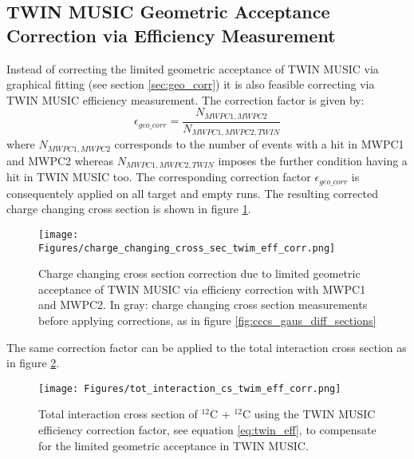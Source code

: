 \begin{appendices}
\section {TWIN MUSIC Geometric Acceptance Correction via Efficiency Measurement}
Instead of correcting the limited geometric acceptance of TWIN MUSIC via graphical fitting (see section \ref{sec:geo_corr}) it is also feasible correcting via TWIN MUSIC efficiency measurement. The correction factor is given by:
\begin{equation}\label{eq:twin_eff}
\epsilon_{geo\text{\_}corr} = \frac{N_{MWPC1,MWPC2}}{N_{MWPC1,MWPC2,TWIN}}
\end{equation}
where $N_{MWPC1,MWPC2}$ corresponds to the number of events with a hit in MWPC1 and MWPC2 whereas $N_{MWPC1,MWPC2,TWIN}$ imposes the further condition having a hit in TWIN MUSIC too.\newline
The corresponding correction factor $\epsilon_{geo\text{\_}corr}$ is consequentely applied on all target and empty runs. The resulting corrected charge changing cross section is shown in figure \ref{fig:twim_corr_cc_cs}. 
\begin{figure}[h!]
    \centering
    \texttt{[image: Figures/charge\_changing\_cross\_sec\_twim\_eff\_corr.png]}
    \caption{
        Charge changing cross section correction due to limited geometric acceptance of TWIN MUSIC via efficieny correction with MWPC1 and MWPC2. In gray: charge changing cross section measurements before applying corrections, as in figure \ref{fig:cccs_gaus_diff_sections}}
    \label{fig:twim_corr_cc_cs}
\end{figure}
The same correction factor can be applied to the total interaction cross section as in figure \ref{fig:twim_corr_tot_cs}. 
\begin{figure}[h!]
    \centering
    \texttt{[image: Figures/tot\_interaction\_cs\_twim\_eff\_corr.png]}
    \caption{
        Total interaction cross section of $^{12}$C + $^{12}$C using the TWIN MUSIC efficiency correction factor, see equation \ref{eq:twin_eff}, to compensate for the limited geometric acceptance in TWIN MUSIC.}
    \label{fig:twim_corr_tot_cs}
\end{figure}
\newpage



\end{appendices}
